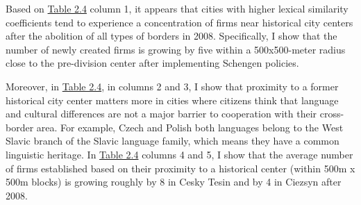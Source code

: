 \documentclass[12pt]{article}    %
\begin{document}
\par Based on \hyperlink{Table 2.4}{Table 2.4} column 1, it appears that cities with higher lexical similarity coefficients tend to experience a concentration of firms near historical city centers after the abolition of all types of borders in 2008. Specifically, I show that  the number of newly created firms is growing by five within a 500x500-meter radius close to the pre-division center after implementing Schengen policies.

\par Moreover, in \hyperlink{Table 2.4}{Table 2.4}, in columns 2 and 3, I show that proximity to a former historical city center matters more in cities where citizens think that language and cultural differences are not a major barrier to cooperation with their cross-border area. For example,  Czech and Polish both languages belong to the West Slavic branch of the Slavic language family, which means they have a common linguistic heritage. In \hyperlink{Table 2.4}{Table 2.4} columns 4 and 5, I show that the average number of firms established based on their proximity to a historical center (within 500m x 500m blocks) is growing roughly by 8 in Cesky Tesin and by 4 in Ciezsyn after 2008. 


\end{document}
